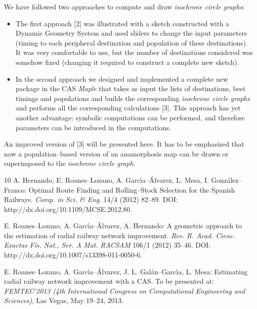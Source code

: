 \documentclass[a4paper]{article} %
\begin{document}
\begin{itemize}
      We have followed two approaches to compute and draw \textit{isochrone circle graphs}:
      \begin{itemize}
      \item The first approach [2] was illustrated with a sketch constructed with a Dynamic Geometry System and
            used sliders to change the input parameters (timing to each peripheral destination and population
            of these destinations). It was very comfortable to use, but the number of destinations
            considered was somehow fixed (changing it required to construct a complete new sketch).
      \item In the second approach we designed and implemented a complete new package in the CAS \textit{Maple}
            that takes as input the lists of destinations, best timings and populations and builds the
            corresponding \textit{isochrone circle graphs} and performs all the corresponding calculations [3].
            This approach has yet another advantage: symbolic computations can be performed, and therefore
            parameters can be introduced in the computations.
       \end{itemize}
\end{itemize}

An improved version of [3] will be presented here. It has to be
emphasized that now a population--based version of an
anamorphosis map can be drawn or superimposed to the
\textit{isochrone circle graph}.



\begin{thebibliography}{10}
A. Hernando, E. Roanes--Lozano, A. Garc\'{\i}a--\'Alvarez, L. Mesa, I. Gonz\'alez--Franco:
Optimal Route Finding and Rolling--Stock Selection for the Spanish Railways.
\textit{Comp. in Sci. \& Eng.} 14/4 (2012) 82--89.
DOI: http://dx.doi.org/10.1109/MCSE.2012.80.

E. Roanes--Lozano, A. Garc\'{\i}a--\'Alvarez, A. Hernando:
A geometric approach to the estimation of radial railway network improvement.
\textit{Rev. R. Acad. Cienc. Exactas F\'is. Nat., Ser. A Mat. RACSAM}
106/1 (2012) 35--46.
DOI: http://dx.doi.org/10.1007/s13398-011-0050-6.

E. Roanes--Lozano, A. Garc\'{\i}a--\'Alvarez, J. L. Gal\'an--Garc\'{\i}a, L. Mesa:
Estimating radial railway network improvement with a CAS.
To be presented at:
\textit{FEMTEC'2013 (4th International Congress on Computational Engineering and
         Sciences)}, Las Vegas, May 19--24, 2013.

\end{thebibliography}
\end{document}
